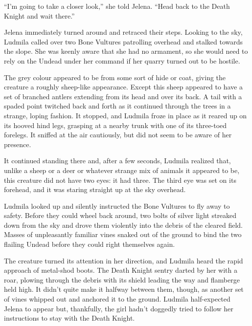  

“I’m going to take a closer look,” she told Jelena. “Head back to the Death Knight and wait there.”

 

Jelena immediately turned around and retraced their steps. Looking to the sky, Ludmila called over two Bone Vultures patrolling overhead and stalked towards the slope. She was keenly aware that she had no armament, so she would need to rely on the Undead under her command if her quarry turned out to be hostile.

 

The grey colour appeared to be from some sort of hide or coat, giving the creature a roughly sheep-like appearance. Except this sheep appeared to have a set of branched antlers extending from its head and over its back. A tail with a spaded point twitched back and forth as it continued through the trees in a strange, loping fashion. It stopped, and Ludmila froze in place as it reared up on its hooved hind legs, grasping at a nearby trunk with one of its three-toed forelegs. It sniffed at the air cautiously, but did not seem to be aware of her presence.

 

It continued standing there and, after a few seconds, Ludmila realized that, unlike a sheep or a deer or whatever strange mix of animals it appeared to be, this creature did not have two eyes: it had three. The third eye was set on its forehead, and it was staring straight up at the sky overhead.

 

Ludmila looked up and silently instructed the Bone Vultures to fly away to safety. Before they could wheel back around, two bolts of silver light streaked down from the sky and drove them violently into the debris of the cleared field. Masses of unpleasantly familiar vines snaked out of the ground to bind the two flailing Undead before they could right themselves again.

 

The creature turned its attention in her direction, and Ludmila heard the rapid approach of metal-shod boots. The Death Knight sentry darted by her with a roar, plowing through the debris with its shield leading the way and flamberge held high. It didn’t quite make it halfway between them, though, as another set of vines whipped out and anchored it to the ground. Ludmila half-expected Jelena to appear but, thankfully, the girl hadn’t doggedly tried to follow her instructions to stay with the Death Knight.

